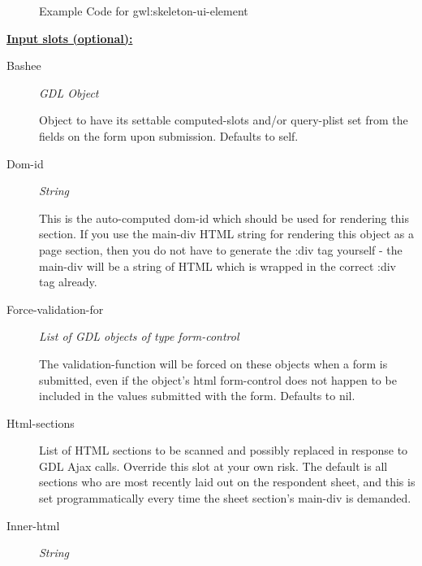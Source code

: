 \documentclass [11pt]{book}
\begin{document}
\begin{itemize}
\begin{figure}
\caption{Example Code for gwl:skeleton-ui-element}

\label{fig:example-code-gwl:skeleton-ui-element}

\end{figure}





\textbf{
\underline{Input slots (optional):}}

\begin{description}

\item [Bashee]
\emph{GDL Object}

 Object to have its settable computed-slots and/or query-plist set
from the fields on the form upon submission. Defaults to self.




\item [Dom-id]
\emph{String}

 This is the auto-computed dom-id which should be used for rendering
this section. If you use the main-div HTML string for rendering this object as a
page section, then you do not have to generate the :div tag yourself - the main-div
will be a string of HTML which is wrapped in the correct :div tag already.




\item [Force-validation-for]
\emph{List of GDL objects of type form-control}

 The validation-function will be forced
on these objects when a form is submitted, even if the object's html form-control does
not happen to be included in the values submitted with the form. Defaults to nil.




\item [Html-sections]

List of HTML sections to be scanned and possibly replaced in response to
GDL Ajax calls. Override this slot at your own risk. The default is all
sections who are most recently laid out on the respondent sheet, and
this is set programmatically every time the sheet section's main-div
is demanded.




\item [Inner-html]
\emph{String}


\end{description}
\end{itemize}
\end{document}
